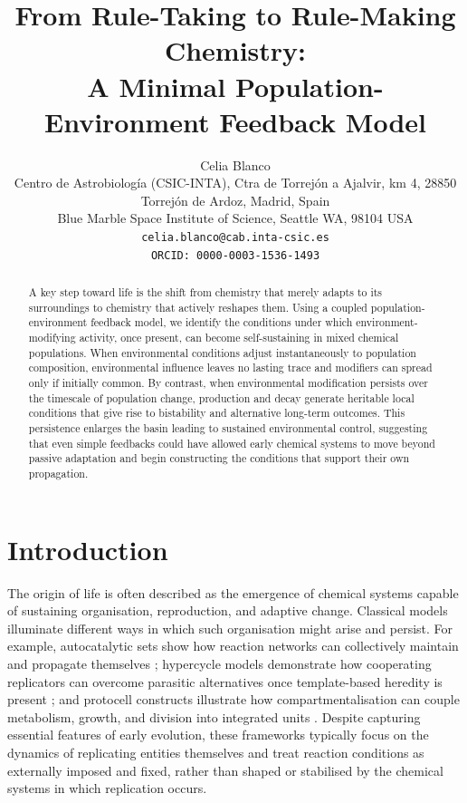 \documentclass[11pt]{article}
\title{From Rule-Taking to Rule-Making Chemistry: \\ A Minimal Population-Environment Feedback Model}
\author{
\begin{center}
Celia Blanco\\
\smallskip
\small Centro de Astrobiología (CSIC-INTA), Ctra de Torrejón a Ajalvir, km 4, 28850 Torrejón de Ardoz, Madrid, Spain\\
\small Blue Marble Space Institute of Science, Seattle WA, 98104 USA\\
\smallskip
\small \texttt{celia.blanco@cab.inta-csic.es}\\
\smallskip
\small \texttt{ORCID: 0000-0003-1536-1493}
\end{center}
}
\date{}
\begin{document}
\maketitle

\begin{abstract}
A key step toward life is the shift from chemistry that merely adapts to its surroundings to chemistry that actively reshapes them. Using a coupled population-environment feedback model, we identify the conditions under which environment-modifying activity, once present, can become self-sustaining in mixed chemical populations. When environmental conditions adjust instantaneously to population composition, environmental influence leaves no lasting trace and modifiers can spread only if initially common. By contrast, when environmental modification persists over the timescale of population change, production and decay generate heritable local conditions that give rise to bistability and alternative long-term outcomes. This persistence enlarges the basin leading to sustained environmental control, suggesting that even simple feedbacks could have allowed early chemical systems to move beyond passive adaptation and begin constructing the conditions that support their own propagation.
\end{abstract}
 
\section{Introduction}

The origin of life is often described as the emergence of chemical systems capable of sustaining organisation, reproduction, and adaptive change. Classical models illuminate different ways in which such organisation might arise and persist. For example, autocatalytic sets show how reaction networks can collectively maintain and propagate themselves \cite{Kauffman1986Autocatalytic}; hypercycle models demonstrate how cooperating replicators can overcome parasitic alternatives once template-based heredity is present \cite{Eigen1977}; and protocell constructs illustrate how compartmentalisation can couple metabolism, growth, and division into integrated units \cite{Szostak2001}. Despite capturing essential features of early evolution, these frameworks typically focus on the dynamics of replicating entities themselves and treat reaction conditions as externally imposed and fixed, rather than shaped or stabilised by the chemical systems in which replication occurs.
\end{document}
